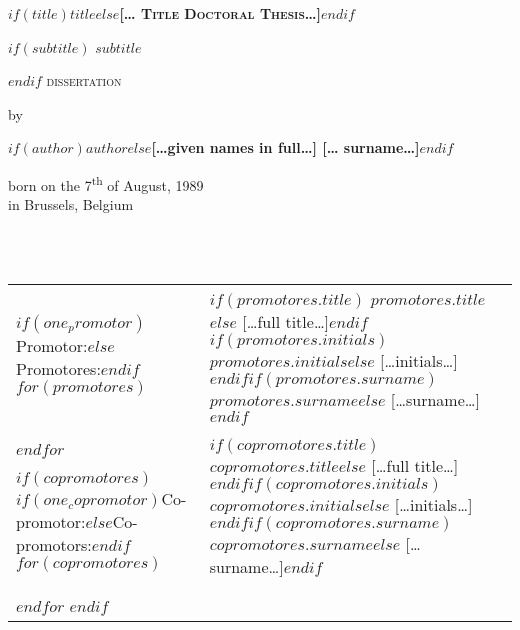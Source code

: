 \documentclass[$if(fontsize)$$fontsize$,$endif$$if(papersize)$$papersize$paper,twoside,$endif$$for(classoption)$$classoption$$sep$,$endfor$]{$documentclass$} %
\begin{document}
\clearpage
\thispagestyle{empty}
\vspace*{\drop}
\begin{center}
\huge\textbf{\textsc{$if(title)$$title$$else$[… Title Doctoral Thesis…]$endif$}}\par
$if(subtitle)$
\Large\textsc{$subtitle$}\par
$endif$
\vfill %
\large \textsc{dissertation}\par
\vspace{\baselineskip}
\par %
\vspace{\baselineskip}
\vspace*{2cm}
{\normalsize by}\par
\medskip
{\normalsize\textbf{$if(author)$$author$$else$[…given names in full…] [… surname…]$endif$}}\par
\medskip
\normalsize born on the 7\textsuperscript{th} of August, 1989\\
in Brussels, Belgium
\end{center}

\clearpage
\thispagestyle{empty}
\noindent{}\\
\\
\noindent\begin{tabular}{@{}lll}

$if(one_promotor)$Promotor:$else$Promotores:$endif$
$for(promotores)$
& $if(promotores.title)$ $promotores.title$$else$ […full title…]$endif$$if(promotores.initials)$ $promotores.initials$$else$ […initials…]$endif$$if(promotores.surname)$ $promotores.surname$$else$ […surname…]$endif$\\
$endfor$

$if(copromotores)$
$if(one_copromotor)$Co-promotor:$else$Co-promotors:$endif$
$for(copromotores)$
& $if(copromotores.title)$ $copromotores.title$$else$ […full title…]$endif$$if(copromotores.initials)$ $copromotores.initials$$else$ […initials…]$endif$$if(copromotores.surname)$ $copromotores.surname$$else$ […surname…]$endif$\\
$endfor$
$endif$
\end{tabular}\\
\end{document}
